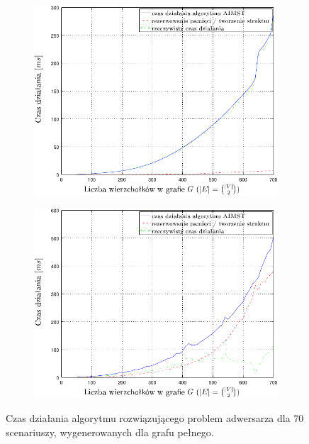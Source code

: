 \begin{figure}[!htbp]
	\renewcommand\figurename{Wykres}
	\null\hfill
	\begin{subfigure}[b]{0.45\textwidth}
		\includegraphics[width=\textwidth]{Chapter_VI/AIMST1-example/AIMST1_psfrag}
		\caption{}
		\label{fig:aimst1:a}
	\end{subfigure}
	\hfill
	\begin{subfigure}[b]{0.45\textwidth}
		\includegraphics[width=\textwidth]{Chapter_VI/AIMST2-example/AIMST2_psfrag}
		\caption{}
		\label{fig:aimst1:b}
	\end{subfigure}
	\hfill\null
	\caption{
		Czas działania algorytmu rozwiązującego problem adwersarza dla $70$ scenariuszy, wygenerowanych dla grafu pełnego.
}
\end{figure}
